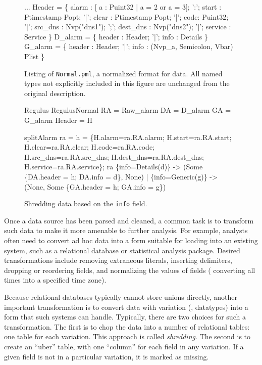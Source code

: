 \begin{figure}
  \centering
  \begin{code}\scriptsize
...
 Header = \{
       alarm : [ a : Puint32 | a = 2 or a = 3];
 ':';  start :  Ptimestamp Popt;
 '|';  clear :  Ptimestamp Popt;
 '|';  code: Puint32;
 '|';  src\_dns  :  Nvp("dns1");
 ';';  dest\_dns :  Nvp("dns2");
 '|';  service  : Service
\}
\mbox{}
 D\_alarm = \{
       header : Header;
 '|';  info   : Details
 \}
\mbox{}
 G\_alarm = \{
       header : Header;
 '|';  info   : (Nvp\_a, Semicolon, Vbar) Plist
\}\end{code}
\caption{Listing of \texttt{\darkstar{}Normal.pml}, a normalized format for
  \darkstar{} data. All named types not explicitly included in this
  figure are unchanged from the original \darkstar{} description.}
\label{fig:normal-darkstar}
\end{figure}

\begin{figure}
\begin{code}\scriptsize
{} Regulus
 RegulusNormal
 RA = Raw\_alarm
 DA = D\_alarm
 GA = G\_alarm
 Header = H

 splitAlarm ra =
     h = 
       \{H.alarm=ra.RA.alarm; H.start=ra.RA.start; 
        H.clear=ra.RA.clear; H.code=ra.RA.code;
        H.src\_dns=ra.RA.src\_dns; 
        H.dest\_dns=ra.RA.dest\_dns;
        H.service=ra.RA.service\};
      ra 
        \{info=Details(d)\} -> 
        (Some \{DA.header = h; DA.info = d\}, None)
      | \{info=Generic(g)\} ->
        (None, Some \{GA.header = h; GA.info = g\})    
  \end{code}
  \caption{Shredding \darkstar{} data based on the {\tt info} field.}
  \label{fig:ex-no-err-check}
\end{figure}

Once a data source has been parsed and cleaned, a common task is to
transform such data to make it more amenable to further analysis.  For
example, analysts often need to convert ad hoc data into a form
suitable for loading into an existing system, such as a relational
database or statistical analysis package. Desired transformations
include removing extraneous literals, inserting delimiters, dropping
or reordering fields, and normalizing the values of fields (\eg{}
converting all times into a specified time zone).

Because relational databases typically cannot store unions directly,
another important transformation is to convert data with variation
(\ie{}, datatypes) into a form that such systems can handle.
Typically, there are two choices for such a transformation.  The first
is to chop the data into a number of relational tables: one table for
each variation.  This approach is called \textit{shredding}. The
second is to create an ``uber'' table, with one ``column'' for each
field in any variation.  If a given field is not in a particular
variation, it is marked as missing. 


